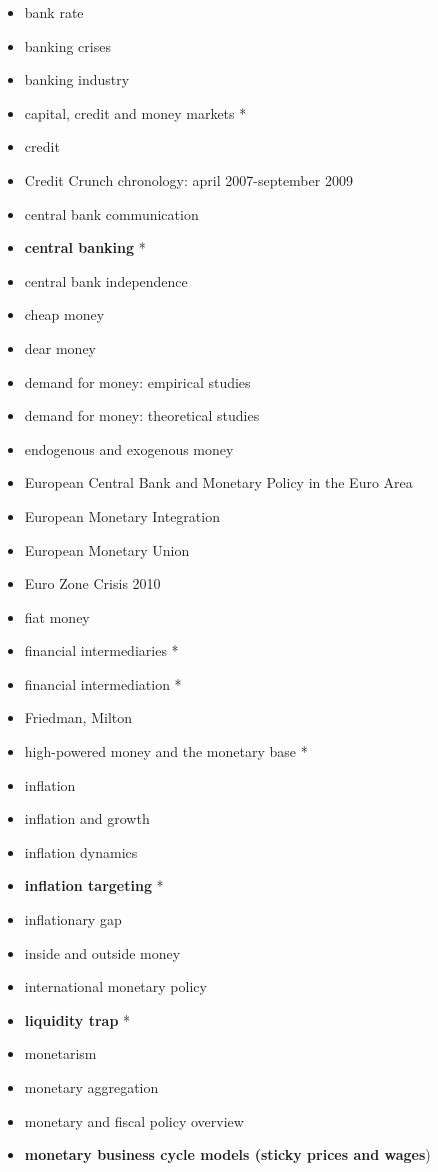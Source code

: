 \documentclass{nuevotema}
\begin{document}
\begin{itemize}
	\item bank rate
	\item banking crises
	\item banking industry
	\item capital, credit and money markets *
	\item credit
	\item Credit Crunch chronology: april 2007-september 2009
	\item central bank communication
	\item \textbf{central banking} *
	\item central bank independence
	\item cheap money
	\item dear money
	\item demand for money: empirical studies
	\item demand for money: theoretical studies
	\item endogenous and exogenous money
	\item European Central Bank and Monetary Policy in the Euro Area
	\item European Monetary Integration
	\item European Monetary Union
	\item Euro Zone Crisis 2010
	\item fiat money
	\item financial intermediaries *
	\item financial intermediation *
	\item Friedman, Milton
	\item high-powered money and the monetary base *
	\item inflation
	\item inflation and growth
	\item inflation dynamics
	\item \textbf{inflation targeting} *	
	\item inflationary gap
	\item inside and outside money
	\item international monetary policy
	\item \textbf{liquidity trap} *
	\item monetarism
	\item monetary aggregation
	\item monetary and fiscal policy overview
	\item \textbf{monetary business cycle models (sticky prices and wages})

\end{itemize}
\end{document}
